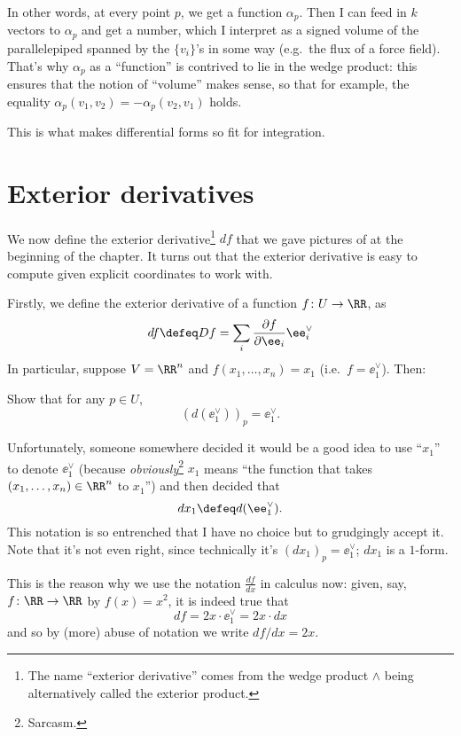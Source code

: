 In other words, at every point $p$, we get a function $\alpha_p$.
Then I can feed in $k$ vectors to $\alpha_p$ and get a number,
which I interpret as a signed volume of the parallelepiped spanned by the $\{v_i\}$'s
in some way (e.g.\ the flux of a force field).
That's why $\alpha_p$ as a ``function'' is contrived to lie in the wedge product:
this ensures that the notion of ``volume'' makes sense, so that for example,
the equality $\alpha_p(v_1, v_2) = -\alpha_p(v_2, v_1)$ holds.

This is what makes differential forms so fit for integration.

\section{Exterior derivatives}
We now define the exterior derivative\footnote{The name ``exterior derivative'' comes from the wedge
product $\wedge$ being alternatively called the exterior product.} $df$ that we gave
pictures of at the beginning of the chapter.
It turns out that the exterior derivative is easy to compute
given explicit coordinates to work with.

Firstly, we define the exterior derivative
of a function $f \colon U \to \RR$, as
\[ df \defeq Df = \sum_i \frac{\partial f}{\partial \ee_i} \ee_i^\vee \]
In particular, suppose $V = \RR^n$ and $f(x_1, \dots, x_n) = x_1$
(i.e.\ $f = \ee_1^\vee$). Then:
\begin{ques}
	Show that for any $p \in U$, \[ \left( d(\ee_1^\vee) \right)_p = \ee_1^\vee. \]
\end{ques}

\begin{abuse}
	Unfortunately, someone somewhere decided
	it would be a good idea to use ``$x_1$'' to denote $\ee_1^\vee$
	(because \emph{obviously}\footnote{Sarcasm.} $x_1$ means
	``the function that takes $(x_1, \dots, x_n) \in \RR^n$ to $x_1$'')
	and then decided that \[ dx_1 \defeq d(\ee_1^\vee). \]
	This notation is so entrenched that I have no choice
	but to grudgingly accept it.
	Note that it's not even right,
	since technically it's $(dx_1)_p = \ee_1^\vee$; $dx_1$ is a $1$-form.
	\label{abuse:dx}
\end{abuse}
\begin{remark}
	This is the reason why we use the notation $\frac{df}{dx}$ in calculus now:
	given, say, $f \colon \RR \to \RR$ by $f(x) = x^2$, it is indeed true that
	\[ df = 2x \cdot \ee_1^\vee = 2x \cdot dx \]
	and so by (more) abuse of notation we write $df/dx = 2x$.
\end{remark}

